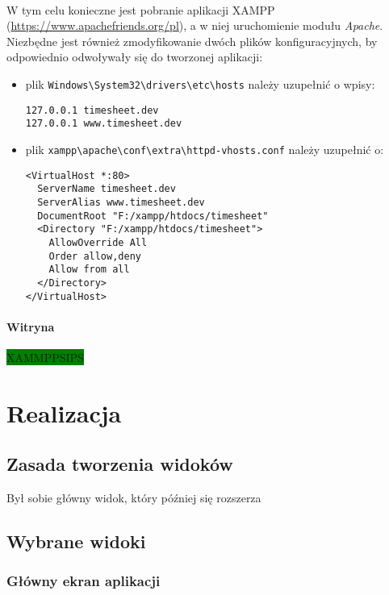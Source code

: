 \documentclass[a4paper, 12pt, oneside]{article}
\begin{document}
			\paragraph{}W tym celu konieczne jest pobranie aplikacji XAMPP (\url{https://www.apachefriends.org/pl}), a w niej uruchomienie modułu \textit{Apache}. Niezbędne jest również zmodyfikowanie dwóch plików konfiguracyjnych, by odpowiednio odwoływały się do tworzonej aplikacji:
			\begin{itemize}
				\item plik \verb+Windows\System32\drivers\etc\hosts+ należy uzupełnić o wpisy:
				\begin{footnotesize}
				\begin{lstlisting}[frame=single]  
127.0.0.1 timesheet.dev 
127.0.0.1 www.timesheet.dev
\end{lstlisting}
\end{footnotesize}
				\item plik \verb+xampp\apache\conf\extra\httpd-vhosts.conf+ należy uzupełnić o:
				\begin{footnotesize}
				\begin{lstlisting}[frame=single]  
<VirtualHost *:80>
  ServerName timesheet.dev
  ServerAlias www.timesheet.dev
  DocumentRoot "F:/xampp/htdocs/timesheet"
  <Directory "F:/xampp/htdocs/timesheet">
    AllowOverride All
    Order allow,deny
    Allow from all
  </Directory>
</VirtualHost>
\end{lstlisting}
\end{footnotesize}
			\end{itemize}
				
			\paragraph{Witryna}
				\colorbox{green}{XAMMPPSIPS}
\section{Realizacja}
	\subsection{Zasada tworzenia widoków}
		Był sobie główny widok, który później się rozszerza
	\subsection{Wybrane widoki}
			\subsubsection{Główny ekran aplikacji}
\end{document}
